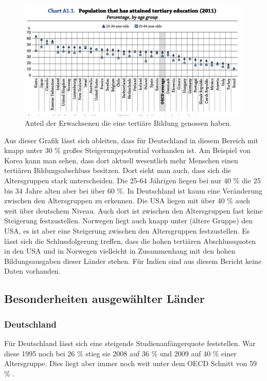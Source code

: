 \begin{figure}[H]
\includegraphics[width=15cm]{./images/tertiary.jpg}
\center
\caption{Anteil der Erwachsenen die eine tertiäre Bildung genossen haben. \cite[26]{oecd5} }
\end{figure}
Aus dieser Grafik lässt sich ableiten, dass für Deutschland in diesem Bereich mit knapp unter 30 \% großes Steigerungspotential vorhanden ist.
Am Beispiel von Korea kann man sehen, dass dort aktuell wesentlich mehr Menschen einen tertiären Bildungsabschluss besitzen. Dort sieht man auch, dass sich die Altersgruppen stark unterscheiden. Die 25-64 Jährigen liegen bei nur 40 \% die 25 bis 34 Jahre alten aber bei über 60 \%. In Deutschland ist kaum eine Veränderung zwischen den Altersgruppen zu erkennen.
Die USA liegen mit über 40 \% auch weit über deutschem Niveau. Auch dort ist zwischen den Altersgruppen fast keine Steigerung festzustellen.
Norwegen liegt auch knapp unter (ältere Gruppe) den USA, es ist aber eine Steigerung zwischen den Altersgruppen festzustellen. Es lässt sich die Schlussfolgerung treffen, dass die hohen tertiären Abschlussquoten in den USA und in Norwegen vielleicht in Zusammenhang mit den hohen Bildungsausgaben dieser Länder stehen.
Für Indien sind aus diesem Bericht keine Daten vorhanden.

\subsection{Besonderheiten ausgewählter Länder}
\subsubsection*{Deutschland}
Für Deutschland lässt sich eine steigende Studienanfängerquote feststellen. War diese 1995 noch bei 26 \%  stieg sie 2008 auf 36 \%  und 2009 auf 40 \% einer Altersgruppe. Dies liegt aber immer noch  weit unter dem OECD Schnitt von 59 \% .

